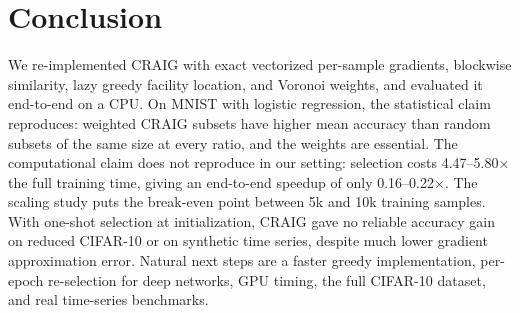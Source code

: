 \documentclass[conference]{IEEEtran}
\begin{document}
\section{Conclusion}
We re-implemented CRAIG with exact vectorized per-sample gradients, blockwise similarity, lazy greedy facility location, and Voronoi weights, and evaluated it end-to-end on a CPU. On MNIST with logistic regression, the statistical claim reproduces: weighted CRAIG subsets have higher mean accuracy than random subsets of the same size at every ratio, and the weights are essential. The computational claim does not reproduce in our setting: selection costs 4.47--5.80$\times$ the full training time, giving an end-to-end speedup of only 0.16--0.22$\times$. The scaling study puts the break-even point between 5k and 10k training samples. With one-shot selection at initialization, CRAIG gave no reliable accuracy gain on reduced CIFAR-10 or on synthetic time series, despite much lower gradient approximation error. Natural next steps are a faster greedy implementation, per-epoch re-selection for deep networks, GPU timing, the full CIFAR-10 dataset, and real time-series benchmarks.



\end{document}

